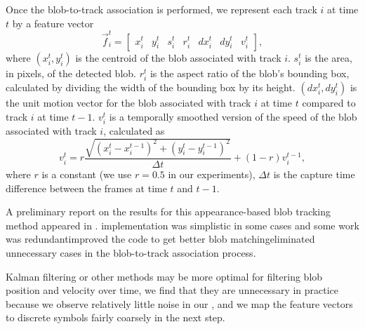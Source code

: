 Once the blob-to-track association is performed, we represent each
track $i$ at time $t$ by a feature vector
\[
    \vec{f}_i^t = \begin{bmatrix} x_i^t & y_i^t & s_i^t & r_i^t &
        dx_i^t & dy_i^t & v_i^t \end{bmatrix},
\]
where $(x_i^t, y_i^t)$ is the centroid of the blob associated with
track $i$. $s_i^t$ is the area, in pixels, of the detected
blob. $r_i^t$ is the aspect ratio of the blob's bounding box,
calculated by dividing the width of the bounding box by its height.
$(dx_i^t, dy_i^t)$ is the unit motion vector for the blob associated
with track $i$ at time $t$ compared to track $i$ at time
$t-1$. $v_i^t$ is a temporally smoothed version of the speed of the
blob associated with track $i$, calculated as
\[
    v_i^t = r \frac{{\sqrt {(x_i^t - x_i^{t - 1} )^2 + (y_i^t - y_i^{t -
        1} )^2 } }}{{\Delta t}} + (1 - r) v_i^{t-1},
\]
where $r$ is a constant (we use $r=0.5$ in our experiments), $\Delta
t$ is the capture time difference between the frames at time $t$ and
$t-1$.

A preliminary report on the results for this appearance-based blob
tracking method appeared in . \DIFdelbegin {}\DIFdelend \DIFaddbegin {}\DIFaddend implementation was simplistic in some cases \DIFdelbegin \DIFdel{, }\DIFdelend and some work was
redundant\DIFdelbegin {}\DIFdelend \DIFaddbegin {}\DIFaddend improved the code to get better blob matching\DIFdelbegin {}\DIFdelend \DIFaddbegin {}\DIFaddend eliminated unnecessary 
cases in the blob-to-track association process.

\DIFdelbegin {}\DIFdelend Kalman filtering or other methods may be more optimal for
filtering blob position and velocity over time, \DIFaddbegin {}\DIFaddend we find that they are unnecessary in 
practice because we observe relatively little noise in our \DIFdelbegin {}\DIFdelend \DIFaddbegin {}\DIFaddend , and we map the feature vectors to discrete 
symbols fairly coarsely in the next step.

